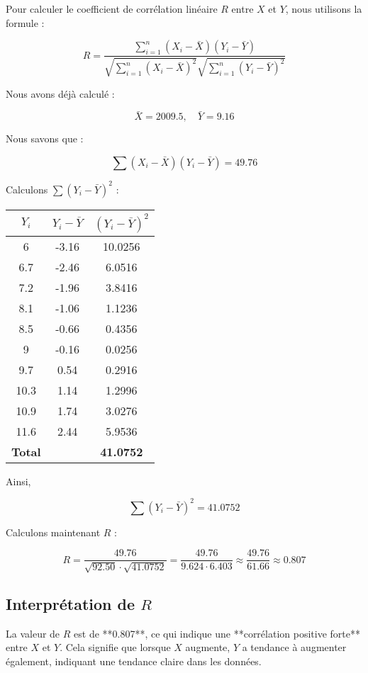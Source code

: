 \documentclass[12pt]{article}
\begin{document}
Pour calculer le coefficient de corrélation linéaire \(R\) entre \(X\) et \(Y\), nous utilisons la formule :

\[
R = \frac{\sum_{i=1}^{n} (X_i - \bar{X})(Y_i - \bar{Y})}{\sqrt{\sum_{i=1}^{n} (X_i - \bar{X})^2} \sqrt{\sum_{i=1}^{n} (Y_i - \bar{Y})^2}}
\]

Nous avons déjà calculé :

\[
\bar{X} = 2009.5, \quad \bar{Y} = 9.16
\]

Nous savons que :

\[
\sum (X_i - \bar{X})(Y_i - \bar{Y}) = 49.76
\]

Calculons \(\sum (Y_i - \bar{Y})^2\) :

\begin{table}[h]
    \centering
    \begin{tabular}{|c|c|c|}
        \hline
        \(Y_i\) & \(Y_i - \bar{Y}\) & \((Y_i - \bar{Y})^2\) \\
        \hline
        6 & -3.16 & 10.0256 \\
        6.7 & -2.46 & 6.0516 \\
        7.2 & -1.96 & 3.8416 \\
        8.1 & -1.06 & 1.1236 \\
        8.5 & -0.66 & 0.4356 \\
        9 & -0.16 & 0.0256 \\
        9.7 & 0.54 & 0.2916 \\
        10.3 & 1.14 & 1.2996 \\
        10.9 & 1.74 & 3.0276 \\
        11.6 & 2.44 & 5.9536 \\
        \hline
        \textbf{Total} & & \textbf{41.0752} \\
        \hline
    \end{tabular}
\end{table}

Ainsi,

\[
\sum (Y_i - \bar{Y})^2 = 41.0752
\]

Calculons maintenant \(R\) :

\[
R = \frac{49.76}{\sqrt{92.50} \cdot \sqrt{41.0752}} = \frac{49.76}{9.624 \cdot 6.403} \approx \frac{49.76}{61.66} \approx 0.807
\]

\subsection*{Interprétation de \(R\)}

La valeur de \(R\) est de **0.807**, ce qui indique une **corrélation positive forte** entre \(X\) et \(Y\). Cela signifie que lorsque \(X\) augmente, \(Y\) a tendance à augmenter également, indiquant une tendance claire dans les données.
\end{document}
